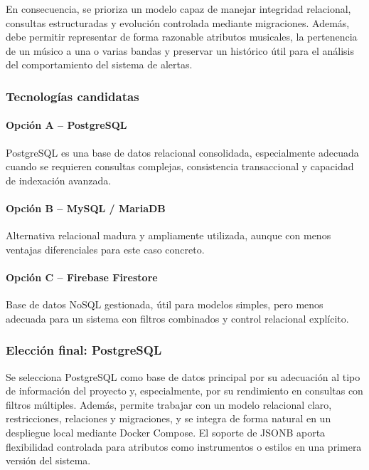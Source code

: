 \documentclass[12pt,a4paper]{report}
\begin{document}
En consecuencia, se prioriza un modelo capaz de manejar integridad relacional, consultas estructuradas y evolución controlada mediante migraciones. Además, debe permitir representar de forma razonable atributos musicales, la pertenencia de un músico a una o varias bandas y preservar un histórico útil para el análisis del comportamiento del sistema de alertas.

\subsubsection{Tecnologías candidatas}

\paragraph{Opción A -- PostgreSQL}
PostgreSQL es una base de datos relacional consolidada, especialmente adecuada cuando se requieren consultas complejas, consistencia transaccional y capacidad de indexación avanzada.

\paragraph{Opción B -- MySQL / MariaDB}
Alternativa relacional madura y ampliamente utilizada, aunque con menos ventajas diferenciales para este caso concreto.

\paragraph{Opción C -- Firebase Firestore}
Base de datos NoSQL gestionada, útil para modelos simples, pero menos adecuada para un sistema con filtros combinados y control relacional explícito.

\subsubsection{Elección final: PostgreSQL}
Se selecciona PostgreSQL como base de datos principal por su adecuación al tipo de información del proyecto y, especialmente, por su rendimiento en consultas con filtros múltiples. Además, permite trabajar con un modelo relacional claro, restricciones, relaciones y migraciones, y se integra de forma natural en un despliegue local mediante Docker Compose. El soporte de JSONB aporta flexibilidad controlada para atributos como instrumentos o estilos en una primera versión del sistema.
\end{document}
